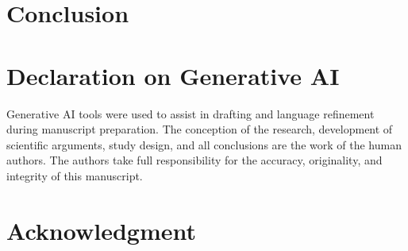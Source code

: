 \documentclass[conference, letterpaper]{IEEEtran}
\begin{document}
\section{Conclusion}


\section*{Declaration on Generative AI}

Generative AI tools were used to assist in drafting and language refinement during manuscript preparation. The conception of the research, development of scientific arguments, study design, and all conclusions are the work of the human authors. The authors take full responsibility for the accuracy, originality, and integrity of this manuscript.

\section*{Acknowledgment}

\end{document}
